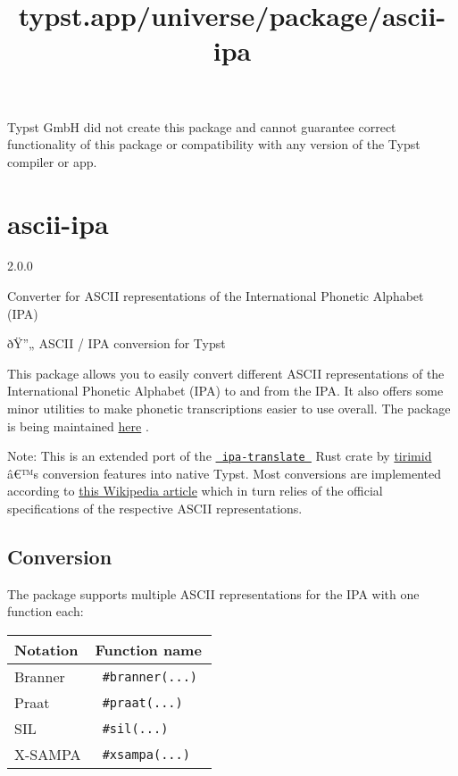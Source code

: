 Typst GmbH did not create this package and cannot guarantee correct
functionality of this package or compatibility with any version of the
Typst compiler or app.


\title{typst.app/universe/package/ascii-ipa}

\label{banner}
\section{ascii-ipa}\label{ascii-ipa}

{ 2.0.0 }

Converter for ASCII representations of the International Phonetic
Alphabet (IPA)

\label{readme}
ðŸ''„ ASCII / IPA conversion for Typst

This package allows you to easily convert different ASCII
representations of the International Phonetic Alphabet (IPA) to and from
the IPA. It also offers some minor utilities to make phonetic
transcriptions easier to use overall. The package is being maintained
\href{https://github.com/imatpot/typst-ascii-ipa}{here} .

Note: This is an extended port of the
\href{https://github.com/tirimid/ipa-translate}{\texttt{\ ipa-translate\ }}
Rust crate by \href{https://github.com/tirimid}{tirimid} â€™s conversion
features into native Typst. Most conversions are implemented according
to
\href{https://en.wikipedia.org/wiki/Comparison_of_ASCII_encodings_of_the_International_Phonetic_Alphabet}{this
Wikipedia article} which in turn relies of the official specifications
of the respective ASCII representations.

\subsection{Conversion}\label{conversion}

The package supports multiple ASCII representations for the IPA with one
function each:

\begin{longtable}[]{@{}ll@{}}
\toprule\noalign{}
Notation & Function name \\
\midrule\noalign{}
\endhead
\bottomrule\noalign{}
\endlastfoot
Branner & \texttt{\ \#branner(...)\ } \\
Praat & \texttt{\ \#praat(...)\ } \\
SIL & \texttt{\ \#sil(...)\ } \\
X-SAMPA & \texttt{\ \#xsampa(...)\ } \\
\end{longtable}

